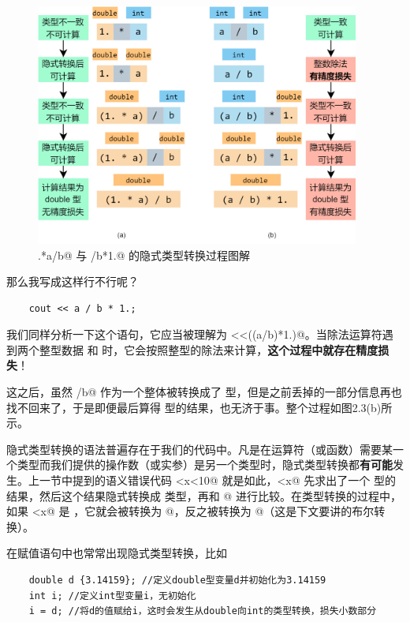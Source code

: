 \begin{figure}[htbp]
    \centering
    \includegraphics[width=0.95\textwidth]{../images/generalized_parts/02_Implicit_type_cast_from_int_to_double.drawio.png}
    \caption{.*a/b@ 与 \lstinline@a/b*1.@ 的隐式类型转换过程图解}
\end{figure}
那么我写成这样行不行呢？
\begin{lstlisting}
    cout << a / b * 1.;
\end{lstlisting}
我们同样分析一下这个语句，它应当被理解为 \lstinline@cout<<((a/b)*1.)@。当除法运算符遇到两个整型数据 \lstinline@a@ 和 \lstinline@b@ 时，它会按照整型的除法来计算，\textbf{这个过程中就存在精度损失}！\par
这之后，虽然 \lstinline@a/b@ 作为一个整体被转换成了 \lstinline@double@ 型，但是之前丢掉的一部分信息再也找不回来了，于是即便最后算得 \lstinline@double@ 型的结果，也无济于事。整个过程如图2.3(b)所示。\par
隐式类型转换的语法普遍存在于我们的代码中。凡是在运算符（或函数）需要某一个类型而我们提供的操作数（或实参）是另一个类型时，隐式类型转换都\textbf{有可能}发生。上一节中提到的语义错误代码 <x<10@ 就是如此，<x@ 先求出了一个 \lstinline@bool@ 型的结果，然后这个结果隐式转换成 \lstinline@int@ 类型，再和 @ 进行比较。在类型转换的过程中，如果 <x@ 是 \lstinline@false@，它就会被转换为 @，反之被转换为 @（这是下文要讲的布尔转换）。\par
在赋值语句中也常常出现隐式类型转换，比如
\begin{lstlisting}
    double d {3.14159}; //定义double型变量d并初始化为3.14159
    int i; //定义int型变量i，无初始化
    i = d; //将d的值赋给i，这时会发生从double向int的类型转换，损失小数部分
\end{lstlisting}
